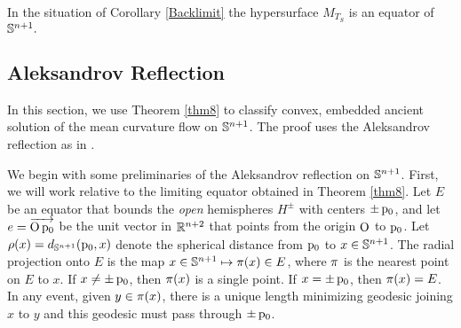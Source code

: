 \documentclass{amsart}
\begin{document}

\begin{theorem}
In the situation of Corollary \ref{Backlimit} the hypersurface $M_{T_S}$ is an equator of $\S^{n+1}.$
\end{theorem}


\subsection{Aleksandrov Reflection}

In this section, we use Theorem \ref{thm8} to classify convex, embedded ancient solution of the mean curvature flow on \(\S^{n+1}\). The proof uses the Aleksandrov reflection as in \cite{bryanlouie}.

We begin with some preliminaries of the Aleksandrov reflection on \(\S^{n+1}\). First, we will work relative to the limiting equator obtained in Theorem \ref{thm8}. Let \(E\) be an equator that bounds the \emph{open} hemispheres \(H^{\pm}\) with centers \(\pm \basepoint\), and let \(\vertvec = \overrightarrow{\origin\basepoint}\) be the unit vector in \(\R^{n+2}\) that points from the origin \(\origin\) to \(\basepoint\). Let \(\radialdistance(x) = d_{\S^{n+1}} (\basepoint, x)\) denote the spherical distance from \(\basepoint\) to \(x \in \S^{n+1}\). The radial projection onto \(E\) is the map \(x \in \S^{n+1} \mapsto \radialprojection(x) \in E\), where \(\radialprojection\) is the nearest point on \(E\) to \(x\). If \(x \ne \pm \basepoint\), then \(\radialprojection(x)\) is a single point. If \(x = \pm \basepoint\), then \(\radialprojection(x) = E\). In any event, given \(y \in \radialprojection(x)\), there is a unique length minimizing geodesic joining \(x\) to \(y\) and this geodesic must pass through \(\pm \basepoint\).
\end{document}
